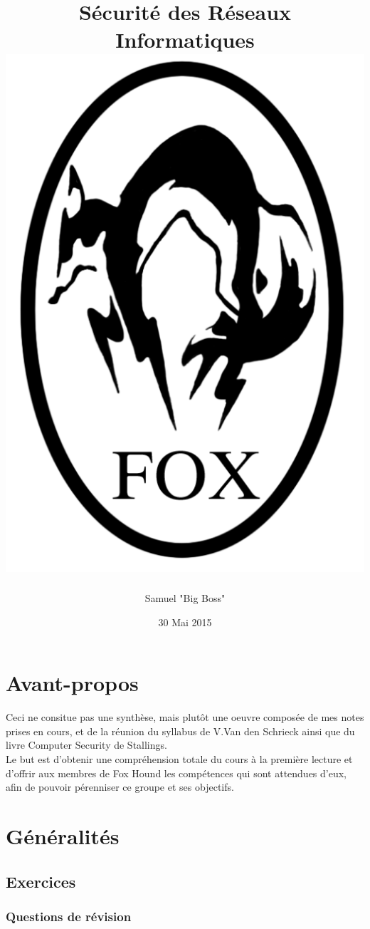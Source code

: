 \documentclass{report}
\title{Sécurité des Réseaux Informatiques\\\includegraphics[scale=0.3]{foxhound.png}}
\author{Samuel "Big Boss" \bsc{Monroe}}
\date{30 Mai 2015}
\begin{document}
\maketitle

\newpage
\thispagestyle{empty}
\mbox{}

\tableofcontents


\chapter{Avant-propos}

	Ceci ne consitue pas une synthèse, mais plutôt une oeuvre composée de mes notes prises en cours, et de la réunion du syllabus de V.Van den Schrieck ainsi que du livre Computer Security de Stallings.\\

	Le but est d'obtenir une compréhension totale du cours à la première lecture et d'offrir aux membres de Fox Hound les compétences qui sont attendues d'eux, afin de pouvoir pérenniser ce groupe et ses objectifs.\\

\chapter{Généralités}

	\section{Exercices}

		\subsection{Questions de révision}
\end{document}
